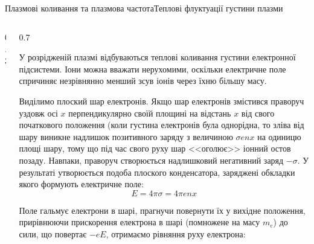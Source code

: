 \documentclass[]{beamer}
\begin{document}
\begin{frame}{Плазмові коливання та плазмова частота}{Теплові флуктуації густини плазми}
	\begin{columns}
		\begin{column}{0.3\linewidth}
			\begin{overprint}
				
				
			\end{overprint}

		\end{column}
		\quad
		\begin{column}{0.7\linewidth}
			\begin{overprint}
				\onslide<1>
				\begin{block}{}\justifying\small
					У розрідженій плазмі відбуваються теплові коливання густини електронної підсистеми. Іони можна вважати нерухомими, оскільки електричне поле спричиняє незрівнянно менший зсув іонів через їхню більшу масу.
				\end{block}
				\begin{center}
				\end{center}
				\onslide<2>
				\begin{block}{}\justifying\small
					Виділимо плоский шар електронів. Якщо шар електронів змістився праворуч уздовж осі $x$ перпендикулярно своїй площині на відстань $ x $ від свого початкового положення (коли густина електронів була однорідна, то зліва від шару виникне надлишок позитивного заряду з величиною $\sigma enx$ на одиницю площі шару, тому що під час свого руху шар <<оголює>> іонний остов позаду. Навпаки, праворуч створюється надлишковий негативний заряд $ - \sigma$. У результаті утворюється подоба плоского конденсатора, заряджені обкладки якого формують електричне поле:
					\begin{equation*}
						E = 4\pi\sigma = 4\pi en x
					\end{equation*}
				\end{block}
				\onslide<3>
				\begin{block}{}\justifying\small
					Поле гальмує електрони в шарі, прагнучи повернути їх у вихідне положення, прирівнюючи прискорення електрона в шарі (помножене на масу $m_e$) до сили, що повертає $ -eE$, отримаємо рівняння руху електрона:

\end{block}
\end{overprint}
\end{column}
\end{columns}
\end{frame}
\end{document}
